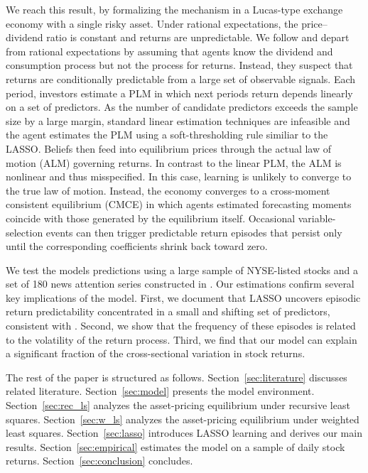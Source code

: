\documentclass[11pt]{article}
\begin{document}
We reach this result, by formalizing the mechanism in a Lucas-type exchange economy with a single risky asset.
Under rational expectations, the price–dividend ratio is constant and returns are unpredictable. 
We follow \citet{Adam2016} and depart from rational expectations by assuming that agents know the dividend and consumption process but not the process for returns. 
Instead, they suspect that returns are conditionally predictable from a large set of observable signals. 
Each period, investors estimate a PLM in which next periods return depends linearly on a set of predictors.
As the number of candidate predictors exceeds the sample size by a large margin, standard linear estimation techniques are infeasible and the agent estimates the PLM using a soft-thresholding rule similiar to the LASSO. 
Beliefs then feed into equilibrium prices through the actual law of motion (ALM) governing returns.
In contrast to the linear PLM, the ALM is nonlinear and thus misspecified.
In this case, learning is unlikely to converge to the true law of motion.
Instead, the economy converges to a cross-moment consistent equilibrium (CMCE) in which agents estimated forecasting moments coincide with those generated by the equilibrium itself.
Occasional variable-selection events can then trigger predictable return episodes that persist only until the corresponding coefficients shrink back toward zero.

We test the models predictions using a large sample of NYSE-listed stocks and a set of 180 news attention series constructed in \citet{Bybee2021}.
Our estimations confirm several key implications of the model.
First, we document that LASSO uncovers episodic return predictability concentrated in a small and shifting set of predictors, consistent with \citet{Chinco2019}. 
Second, we show that the frequency of these episodes is related to the volatility of the return process. 
Third, we find that our model can explain a significant fraction of the cross-sectional variation in stock returns.

The rest of the paper is structured as follows. 
Section~\ref{sec:literature} discusses related literature.
Section~\ref{sec:model} presents the model environment. 
Section~\ref{sec:rec_ls} analyzes the asset-pricing equilibrium under recursive least squares. 
Section~\ref{sec:w_ls} analyzes the asset-pricing equilibrium under weighted least squares. 
Section~\ref{sec:lasso} introduces LASSO learning and derives our main results. 
Section~\ref{sec:empirical} estimates the model on a sample of daily stock returns. 
Section~\ref{sec:conclusion} concludes.
\end{document}
